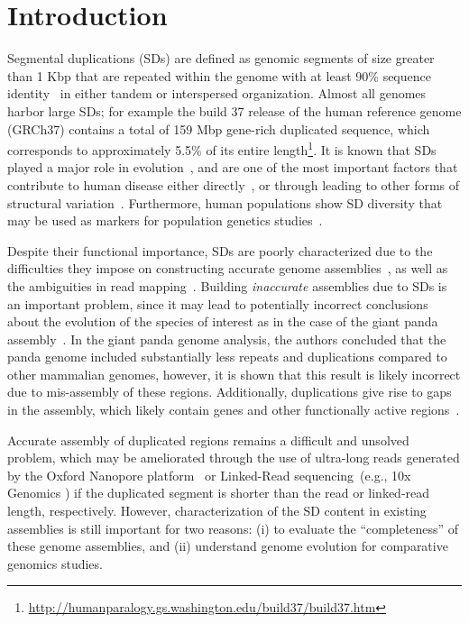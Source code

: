 \documentclass{article}
\begin{document}
\section{Introduction}
Segmental duplications (SDs) are defined as genomic segments of size greater than 1 Kbp that are repeated within the genome with at least 90\% sequence identity~\citep{Bailey2001} in either tandem or interspersed organization. Almost all genomes harbor large SDs; for example the build 37 release of the human reference genome (GRCh37) contains a total of 159 Mbp gene-rich duplicated sequence, which corresponds to approximately 5.5\% of its entire length\footnote{\href{http://humanparalogy.gs.washington.edu/build37/build37.htm}{http://humanparalogy.gs.washington.edu/build37/build37.htm}}. 
It is known that SDs played a major role in evolution~\citep{Marques-Bonet2009,Prado-Martinez2013,Sudmant2013},
and are one of the most important factors that contribute to human disease either directly~\citep{Gonzalez2005,Yang2007,Hollox2008}, or through leading to other forms of structural variation~\citep{Alkan2011,Mills2011}. Furthermore, human populations show SD diversity that may be used as markers for population genetics studies~\citep{Alkan2009,Sudmant2010}.

Despite their functional importance, SDs are poorly characterized due to the difficulties they impose on constructing accurate genome assemblies~\citep{Alkan2011b,Chaisson2015,Steinberg2017}, as well as the ambiguities in read mapping~\citep{Treangen2012,Firtina2016}. Building {\em inaccurate\/} assemblies due to SDs is an important problem, since it may lead to potentially incorrect conclusions about the evolution of the species of interest as in the case of the giant panda assembly~\citep{Li2010c}. In the giant panda genome analysis, the authors concluded that the panda genome included substantially less repeats and duplications compared to other mammalian genomes, however, it is shown that this result is likely incorrect due to mis-assembly of these regions.
Additionally, duplications give rise to gaps in the assembly, which likely contain genes and other functionally active regions~\citep{Bailey2001,Bailey2002,Alkan2011b}.

Accurate assembly of duplicated regions remains a difficult and unsolved problem, which may be ameliorated through the use of ultra-long reads generated by the Oxford Nanopore platform~\citep{Jain2018} 
or Linked-Read sequencing~(e.g., 10x Genomics \citep{Mostovoy2016,Yeo2018}) if the duplicated segment is shorter than the read or linked-read length, respectively. 
However, characterization of the SD content in existing assemblies is still important for two reasons: (i) to evaluate the ``completeness'' of these genome assemblies, and (ii) understand genome evolution for comparative genomics studies.
\end{document}
